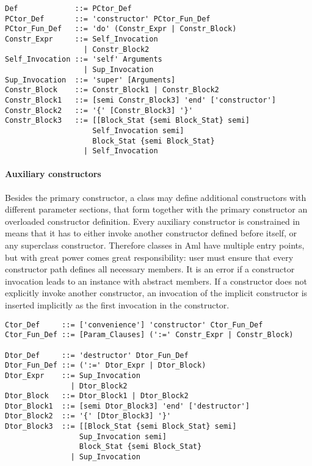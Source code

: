 \grammar\begin{lstlisting}
Def             ::= PCtor_Def
PCtor_Def       ::= 'constructor' PCtor_Fun_Def
PCtor_Fun_Def   ::= 'do' (Constr_Expr | Constr_Block)
Constr_Expr     ::= Self_Invocation
                  | Constr_Block2
Self_Invocation ::= 'self' Arguments
                  | Sup_Invocation
Sup_Invocation  ::= 'super' [Arguments]
Constr_Block    ::= Constr_Block1 | Constr_Block2
Constr_Block1   ::= [semi Constr_Block3] 'end' ['constructor']
Constr_Block2   ::= '{' [Constr_Block3] '}'
Constr_Block3   ::= [[Block_Stat {semi Block_Stat} semi] 
                    Self_Invocation semi] 
                    Block_Stat {semi Block_Stat}
                  | Self_Invocation
\end{lstlisting}

\paragraph{Auxiliary constructors}
Besides the primary constructor, a class may define additional constructors with different parameter sections, that form together with the primary constructor an overloaded constructor definition. Every auxiliary constructor is constrained in means that it has to either invoke another constructor defined before itself, or any superclass constructor. Therefore classes in Aml have multiple entry points, but with great power comes great responsibility: user must ensure that every constructor path defines all necessary members. It is an error if a constructor invocation leads to an instance with abstract members. If a constructor does not explicitly invoke another constructor, an invocation of the implicit constructor is inserted implicitly as the first invocation in the constructor. 

\grammar\begin{lstlisting}
Ctor_Def     ::= ['convenience'] 'constructor' Ctor_Fun_Def
Ctor_Fun_Def ::= [Param_Clauses] (':=' Constr_Expr | Constr_Block)

Dtor_Def     ::= 'destructor' Dtor_Fun_Def
Dtor_Fun_Def ::= (':=' Dtor_Expr | Dtor_Block)
Dtor_Expr    ::= Sup_Invocation
               | Dtor_Block2
Dtor_Block   ::= Dtor_Block1 | Dtor_Block2
Dtor_Block1  ::= [semi Dtor_Block3] 'end' ['destructor']
Dtor_Block2  ::= '{' [Dtor_Block3] '}'
Dtor_Block3  ::= [[Block_Stat {semi Block_Stat} semi] 
                 Sup_Invocation semi] 
                 Block_Stat {semi Block_Stat}
               | Sup_Invocation
\end{lstlisting}

